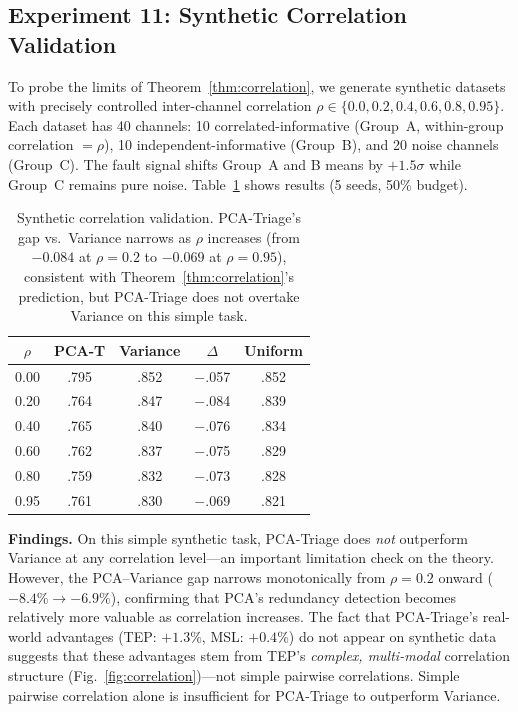 \documentclass[journal]{IEEEtran}
\begin{document}
\subsection{Experiment 11: Synthetic Correlation Validation}

To probe the limits of Theorem~\ref{thm:correlation}, we generate synthetic datasets with precisely controlled inter-channel correlation $\rho \in \{0.0, 0.2, 0.4, 0.6, 0.8, 0.95\}$. Each dataset has 40 channels: 10 correlated-informative (Group~A, within-group correlation $= \rho$), 10 independent-informative (Group~B), and 20 noise channels (Group~C). The fault signal shifts Group~A and B means by $+1.5\sigma$ while Group~C remains pure noise. Table~\ref{tab:synth_corr} shows results (5 seeds, 50\% budget).

\begin{table}[t]
\centering
\caption{Synthetic correlation validation. PCA-Triage's gap vs.\ Variance narrows as $\rho$ increases (from $-0.084$ at $\rho{=}0.2$ to $-0.069$ at $\rho{=}0.95$), consistent with Theorem~\ref{thm:correlation}'s prediction, but PCA-Triage does not overtake Variance on this simple task.}
\begin{tabular}{@{}ccccc@{}}
\toprule
$\rho$ & \textbf{PCA-T} & \textbf{Variance} & \textbf{$\Delta$} & \textbf{Uniform} \\
\midrule
0.00 & .795 & .852 & $-$.057 & .852 \\
0.20 & .764 & .847 & $-$.084 & .839 \\
0.40 & .765 & .840 & $-$.076 & .834 \\
0.60 & .762 & .837 & $-$.075 & .829 \\
0.80 & .759 & .832 & $-$.073 & .828 \\
0.95 & .761 & .830 & $-$.069 & .821 \\
\bottomrule
\end{tabular}
\label{tab:synth_corr}
\end{table}

\textbf{Findings.} On this simple synthetic task, PCA-Triage does \textit{not} outperform Variance at any correlation level---an important limitation check on the theory. However, the PCA--Variance gap narrows monotonically from $\rho = 0.2$ onward ($-8.4\% \to -6.9\%$), confirming that PCA's redundancy detection becomes relatively more valuable as correlation increases. The fact that PCA-Triage's real-world advantages (TEP: $+1.3\%$, MSL: $+0.4\%$) do not appear on synthetic data suggests that these advantages stem from TEP's \textit{complex, multi-modal} correlation structure (Fig.~\ref{fig:correlation})---not simple pairwise correlations. Simple pairwise correlation alone is insufficient for PCA-Triage to outperform Variance.
\end{document}

